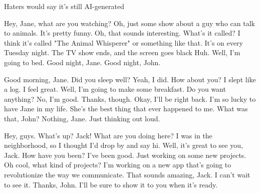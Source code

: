 \BlockStageDirection Haters would say it's still AI-generated

  Hey, Jane, what are you watching?
  Oh, just some show about a guy who can talk to animals. It's pretty funny.
  Oh, that sounds interesting. What's it called?
  I think it's called "The Animal Whisperer" or something like that. It's on every Tuesday night.
\BlockStageDirection The TV show ends, and the screen goes black
 Huh.
  Well, I'm going to bed. Good night, Jane.
  Good night, John.

  Good morning, Jane. Did you sleep well?
  Yeah, I did. How about you?
  I slept like a log. I feel great.
  Well, I'm going to make some breakfast. Do you want anything?
  No, I'm good. Thanks, though.
  Okay, I'll be right back.
  I'm so lucky to have Jane in my life. She's the best thing that ever happened to me.
  What was that, John?
  Nothing, Jane. Just thinking out loud.

  Hey, guys. What's up?
  Jack! What are you doing here?
  I was in the neighborhood, so I thought I'd drop by and say hi.
  Well, it's great to see you, Jack. How have you been?
  I've been good. Just working on some new projects.
 Oh cool, what kind of projects?
  I'm working on a new app that's going to revolutionize the way we communicate.
  That sounds amazing, Jack. I can't wait to see it.
  Thanks, John. I'll be sure to show it to you when it's ready.
